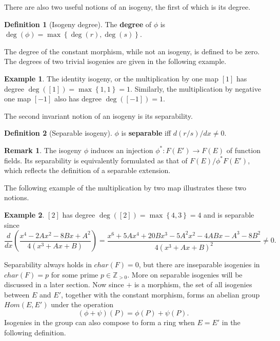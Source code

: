 \documentclass{article}
\newcommand{\Z}{\mathbb{Z}}
\newcommand{\rb}[1]{\left( #1 \right)}
\renewcommand{\sb}[1]{\left[ #1 \right]}
\newcommand{\cb}[1]{\left\{ #1 \right\}}
\theoremstyle{definition}\newtheorem*{definition}{Definition}
\theoremstyle{definition}\newtheorem*{example}{Example}
\theoremstyle{definition}\newtheorem*{remark}{Remark}
\begin{document}
There are also two useful notions of an isogeny, the first of which is its degree.

\begin{definition}[Isogeny degree]
The \textbf{degree} of $ \phi $ is $ \deg\rb{\phi} = \max\cb{\deg\rb{r}, \deg\rb{s}} $.
\end{definition}

The degree of the constant morphism, while not an isogeny, is defined to be zero. The degrees of two trivial isogenies are given in the following example.

\begin{example}
The identity isogeny, or the multiplication by one map $ \sb{1} $ has degree $ \deg\rb{\sb{1}} = \max\cb{1, 1} = 1 $. Similarly, the multiplication by negative one map $ \sb{-1} $ also has degree $ \deg\rb{\sb{-1}} = 1 $.
\end{example}

\pagebreak

The second invariant notion of an isogeny is its separability.

\begin{definition}[Separable isogeny]
$ \phi $ is \textbf{separable} iff $ d\rb{r / s} / dx \ne 0 $.
\end{definition}

\begin{remark}
The isogeny $ \phi $ induces an injection $ \phi^* : F\rb{E'} \to F\rb{E} $ of function fields. Its separability is equivalently formulated as that of $ F\rb{E} / \phi^*F\rb{E'} $, which reflects the definition of a separable extension.
\end{remark}

The following example of the multiplication by two map illustrates these two notions.

\begin{example}
$ \sb{2} $ has degree $ \deg\rb{\sb{2}} = \max\cb{4, 3} = 4 $ and is separable since
$$ \dfrac{d}{dx}\rb{\dfrac{x^4 - 2Ax^2 - 8Bx + A^2}{4\rb{x^3 + Ax + B}}} = \dfrac{x^6 + 5Ax^4 + 20Bx^3 - 5A^2x^2 - 4ABx - A^3 - 8B^2}{4\rb{x^3 + Ax + B}^2} \ne 0. $$
\end{example}

Separability always holds in $ char\rb{F} = 0 $, but there are inseparable isogenies in $ char\rb{F} = p $ for some prime $ p \in \Z_{> 0} $. More on separable isogenies will be discussed in a later section. Now since $ + $ is a morphism, the set of all isogenies between $ E $ and $ E' $, together with the constant morphism, forms an abelian group $ Hom\rb{E, E'} $ under the operation
$$ \rb{\phi + \psi}\rb{P} = \phi\rb{P} + \psi\rb{P}. $$
Isogenies in the group can also compose to form a ring when $ E = E' $ in the following definition.
\end{document}
